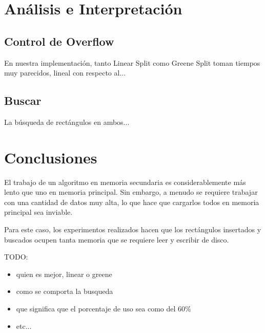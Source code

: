 \documentclass[letterpaper,10pt]{article}
\begin{document}
	\newpage

	\section{Análisis e Interpretación}

	\subsection{Control de Overflow}

	En nuestra implementación, tanto Linear Split como Greene Split toman tiempos muy parecidos, lineal con respecto al...

	\subsection{Buscar}

	La búsqueda de rectángulos en ambos...

	\newpage

	\section{Conclusiones}

	El trabajo de un algoritmo en memoria secundaria es considerablemente más lento que uno en memoria principal. Sin embargo, a menudo se requiere trabajar con una cantidad de datos
	muy alta, lo que hace que cargarlos todos en memoria principal sea inviable.

	Para este caso, los experimentos realizados hacen que los rectángulos insertados y buscados ocupen tanta memoria que se requiere leer y escribir de disco.

	\vspace*{10px}

	TODO:
	\begin{itemize}
		\item quien es mejor, linear o greene
		\item como se comporta la busqueda
		\item que significa que el porcentaje de uso sea como del 60\%
		\item etc...
	\end{itemize}
\end{document}
